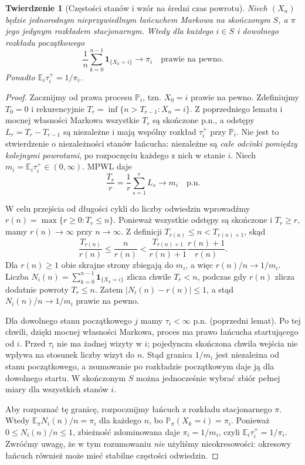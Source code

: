 \documentclass[11pt,a4paper,oneside]{report}
\numberwithin{equation}{chapter}
\theoremstyle{plain}
\newtheorem{twierdzenie}{Twierdzenie}[chapter]
\theoremstyle{definition}
\theoremstyle{remark}
\newcommand{\Prob}{\mathbb{P}}
\newcommand{\E}{\mathbb{E}}
\newcommand{\ind}[1]{\mathbf{1}_{#1}}
\begin{document}
\begin{twierdzenie}[Częstości stanów i wzór na średni czas powrotu]
Niech $(X_n)$ będzie jednorodnym nieprzywiedlnym
łańcuchem Markowa na skończonym $S$, a $\pi$
jego jedynym rozkładem stacjonarnym. Wtedy
dla każdego $i\in S$ i dowolnego rozkładu
początkowego
\[
\frac1n\sum_{k=0}^{n-1}\ind{\{X_k=i\}}
\longrightarrow\pi_i\quad\text{prawie na pewno}.
\]
Ponadto $\E_i\tau_i^+=1/\pi_i$.
\end{twierdzenie}
\begin{proof}
Zacznijmy od prawa procesu $\Prob_i$, tzn.
$X_0=i$ prawie na pewno. Zdefiniujmy $T_0=0$ i
rekurencyjnie $T_r=\inf\{n>T_{r-1}:X_n=i\}$.
Z poprzedniego lematu i mocnej własności Markowa
wszystkie $T_r$ są skończone p.n., a odstępy
$L_r=T_r-T_{r-1}$ są niezależne i mają wspólny
rozkład $\tau_i^+$ przy $\Prob_i$. Nie jest to
stwierdzenie o niezależności stanów łańcucha:
niezależne są \emph{całe odcinki pomiędzy kolejnymi
powrotami}, po rozpoczęciu każdego z nich w stanie $i$.
Niech $m_i=\E_i\tau_i^+\in(0,\infty)$. MPWL daje
\[
 \frac{T_r}{r}=\frac1r\sum_{s=1}^rL_s
 \longrightarrow m_i\quad\text{p.n.}
\]

W celu przejścia od długości cykli do liczby
odwiedzin wprowadźmy
$r(n)=\max\{r\geq0:T_r\leq n\}$.
Ponieważ wszystkie odstępy są skończone i
$T_r\geq r$, mamy $r(n)\to\infty$ przy $n\to\infty$.
Z definicji $T_{r(n)}\leq n<T_{r(n)+1}$, skąd
\[
 \frac{T_{r(n)}}{r(n)}
 \leq\frac n{r(n)}
 <\frac{T_{r(n)+1}}{r(n)+1}
   \frac{r(n)+1}{r(n)}.
\]
Dla $r(n)\geq1$ obie skrajne strony zbiegają
do $m_i$, a więc $r(n)/n\to1/m_i$.
Liczba $N_i(n)=\sum_{k=0}^{n-1}\ind{\{X_k=i\}}$
zlicza chwile $T_r<n$, podczas gdy $r(n)$
zlicza dodatnie powroty $T_r\leq n$.
Zatem $|N_i(n)-r(n)|\leq1$, a stąd
$N_i(n)/n\to1/m_i$ prawie na pewno.

Dla dowolnego stanu początkowego $j$ mamy
$\tau_i<\infty$ p.n. (poprzedni lemat).
Po tej chwili, dzięki mocnej własności Markowa,
proces ma prawo łańcucha startującego od $i$.
Przed $\tau_i$ nie ma żadnej wizyty w $i$;
pojedyncza skończona chwila wejścia nie wpływa
na stosunek liczby wizyt do $n$. Stąd granica
$1/m_i$ jest niezależna od stanu początkowego,
a zsumowanie po rozkładzie początkowym daje ją
dla dowolnego startu. W skończonym $S$ można
jednocześnie wybrać zbiór pełnej miary dla
wszystkich stanów $i$.

Aby rozpoznać tę granicę, rozpocznijmy łańcuch
z rozkładu stacjonarnego $\pi$. Wtedy
$\E_\pi N_i(n)/n=\pi_i$ dla każdego $n$,
bo $\Prob_\pi(X_k=i)=\pi_i$. Ponieważ
$0\leq N_i(n)/n\leq1$, zbieżność zdominowana
daje $\pi_i=1/m_i$, czyli
$\E_i\tau_i^+=1/\pi_i$. Zwróćmy uwagę,
że w tym rozumowaniu \emph{nie} użyliśmy
nieokresowości: okresowy łańcuch również może
mieć stabilne częstości odwiedzin.
\end{proof}
\end{document}
